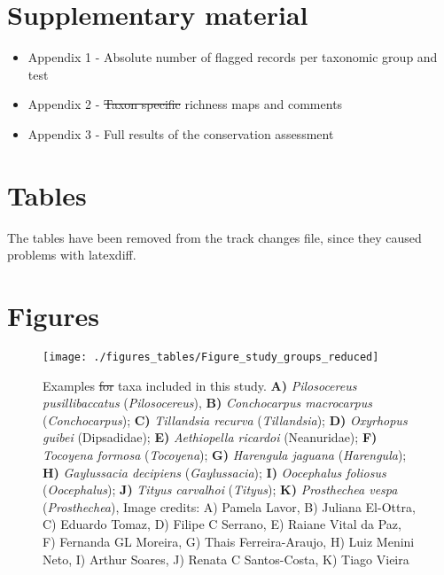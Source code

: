 \documentclass[fleqn,10pt,lineno]{wlpeerj} %
\providecommand{\DIFaddtex}[1]{{\protect\color{blue}\uwave{#1}}} %
\providecommand{\DIFdeltex}[1]{{\protect\color{red}\sout{#1}}}                      %
\providecommand{\DIFaddbegin}{} %
\providecommand{\DIFaddend}{} %
\providecommand{\DIFdelbegin}{} %
\providecommand{\DIFdelend}{} %
\providecommand{\DIFaddFL}[1]{\DIFadd{#1}} %
\providecommand{\DIFdelFL}[1]{\DIFdel{#1}} %
\providecommand{\DIFaddbeginFL}{} %
\providecommand{\DIFaddendFL}{} %
\providecommand{\DIFdelbeginFL}{} %
\providecommand{\DIFdelendFL}{} %
\providecommand{\DIFadd}[1]{\texorpdfstring{\DIFaddtex{#1}}{#1}} %
\providecommand{\DIFdel}[1]{\texorpdfstring{\DIFdeltex{#1}}{}} %
\begin{document}
\hypertarget{supplementary-material}{%
\section*{Supplementary material}\label{supplementary-material}}

\begin{itemize}
\item
  Appendix 1 - Absolute number of flagged records per taxonomic group and test
\item
  Appendix 2 - \DIFdelbegin \DIFdel{Taxon specific }\DIFdelend \DIFaddbegin \DIFadd{Taxon-specific }\DIFaddend richness maps and comments
\item
  Appendix 3 - Full results of the conservation assessment
\end{itemize}

\section{Tables}
The tables have been removed from the track changes file, since they caused problems with latexdiff.

\hypertarget{figures}{%
\section*{Figures}\label{figures}}

\begin{figure}
\DIFdelbeginFL %
\DIFdelendFL \DIFaddbeginFL \texttt{[image: ./figures\_tables/Figure\_study\_groups\_reduced]} \DIFaddendFL \caption{Examples \DIFdelbeginFL \DIFdelFL{for }\DIFdelendFL \DIFaddbeginFL \DIFaddFL{of }\DIFaddendFL taxa included in this study. \textbf{A)} \textit{Pilosocereus pusillibaccatus} (\textit{Pilosocereus}), \textbf{B)} \textit{Conchocarpus macrocarpus} (\textit{Conchocarpus}); \textbf{C)} \textit{Tillandsia recurva} (\textit{Tillandsia}); \textbf{D)} \textit{Oxyrhopus guibei} (Dipsadidae); \textbf{E)} \textit{Aethiopella ricardoi} (Neanuridae); \textbf{F)} \textit{Tocoyena formosa} (\textit{Tocoyena}); \textbf{G)} \textit{Harengula jaguana} (\textit{Harengula}); \textbf{H)} \textit{Gaylussacia decipiens} (\textit{Gaylussacia}); \textbf{I)} \textit{Oocephalus foliosus} (\textit{Oocephalus}); \textbf{J)} \textit{Tityus carvalhoi} (\textit{Tityus}); \textbf{K)} \textit{Prosthechea vespa} (\textit{Prosthechea}), Image credits: A) Pamela Lavor, B) Juliana El-Ottra, C) Eduardo Tomaz, D) Filipe C Serrano, E) Raiane Vital da Paz, F) Fernanda GL Moreira, G) Thais Ferreira-Araujo, H) Luiz Menini Neto, I) Arthur Soares, J) Renata C Santos-Costa, K) Tiago Vieira\DIFaddbeginFL \DIFaddFL{.}\DIFaddendFL }\label{fig:species}
\end{figure}
\end{document}
